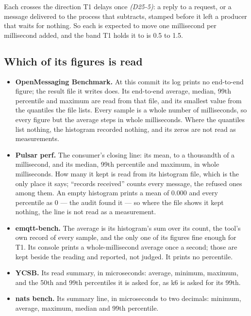 \documentclass[11pt]{article}
\newcommand{\gl}[1]{{\color{soft}\itshape\small (#1)}}
\begin{document}
Each crosses the direction T1 delays once \gl{D25-5}: a reply to a request, or a message
delivered to the process that subtracts, stamped before it left a producer that waits for nothing.
So each is expected to move one millisecond per millisecond added, and the band T1 holds it to is
0.5 to 1.5.

\subsection*{Which of its figures is read}
\begin{itemize}
  \item \textbf{OpenMessaging Benchmark.} At this commit its log prints no end-to-end figure; the
        result file it writes does. Its end-to-end average, median, 99th percentile and maximum
        are read from that file, and its smallest value from the quantiles the file lists. Every
        sample is a whole number of milliseconds, so every figure but the average steps in whole
        milliseconds. Where the quantiles list nothing, the histogram recorded nothing, and its
        zeros are not read as measurements.
  \item \textbf{Pulsar perf.} The consumer's closing line: its mean, to a thousandth of a
        millisecond, and its median, 99th percentile and maximum, in whole milliseconds. How many
        it kept is read from its histogram file, which is the only place it says; ``records
        received'' counts every message, the refused ones among them. An empty histogram prints
        a mean of 0.000 and every percentile as 0 --- the audit found it --- so where the file
        shows it kept nothing, the line is not read as a measurement.
  \item \textbf{emqtt-bench.} The average is its histogram's sum over its count, the tool's own
        record of every sample, and the only one of its figures fine enough for T1. Its console
        prints a whole-millisecond average once a second; those are kept beside the reading and
        reported, not judged. It prints no percentile.
  \item \textbf{YCSB.} Its read summary, in microseconds: average, minimum, maximum, and the 50th
        and 99th percentiles it is asked for, as k6 is asked for its 99th.
  \item \textbf{nats bench.} Its summary line, in microseconds to two decimals: minimum, average,
        maximum, median and 99th percentile.
\end{itemize}
\end{document}
